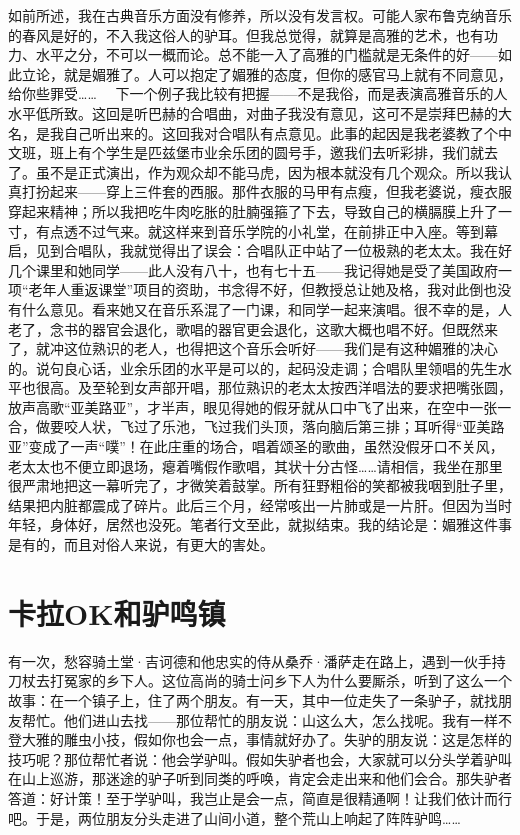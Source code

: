 如前所述，我在古典音乐方面没有修养，所以没有发言权。可能人家布鲁克纳音乐的春风是好的，不入我这俗人的驴耳。但我总觉得，就算是高雅的艺术，也有功力、水平之分，不可以一概而论。总不能一入了高雅的门槛就是无条件的好——如此立论，就是媚雅了。人可以抱定了媚雅的态度，但你的感官马上就有不同意见，给你些罪受……　 下一个例子我比较有把握——不是我俗，而是表演高雅音乐的人水平低所致。这回是听巴赫的合唱曲，对曲子我没有意见，这可不是崇拜巴赫的大名，是我自己听出来的。这回我对合唱队有点意见。此事的起因是我老婆教了个中文班，班上有个学生是匹兹堡市业余乐团的圆号手，邀我们去听彩排，我们就去了。虽不是正式演出，作为观众却不能马虎，因为根本就没有几个观众。所以我认真打扮起来——穿上三件套的西服。那件衣服的马甲有点瘦，但我老婆说，瘦衣服穿起来精神；所以我把吃牛肉吃胀的肚腩强箍了下去，导致自己的横膈膜上升了一寸，有点透不过气来。就这样来到音乐学院的小礼堂，在前排正中入座。等到幕启，见到合唱队，我就觉得出了误会：合唱队正中站了一位极熟的老太太。我在好几个课里和她同学——此人没有八十，也有七十五——我记得她是受了美国政府一项“老年人重返课堂”项目的资助，书念得不好，但教授总让她及格，我对此倒也没有什么意见。看来她又在音乐系混了一门课，和同学一起来演唱。很不幸的是，人老了，念书的器官会退化，歌唱的器官更会退化，这歌大概也唱不好。但既然来了，就冲这位熟识的老人，也得把这个音乐会听好——我们是有这种媚雅的决心的。说句良心话，业余乐团的水平是可以的，起码没走调；合唱队里领唱的先生水平也很高。及至轮到女声部开唱，那位熟识的老太太按西洋唱法的要求把嘴张圆，放声高歌“亚美路亚”，才半声，眼见得她的假牙就从口中飞了出来，在空中一张一合，做要咬人状，飞过了乐池，飞过我们头顶，落向脑后第三排；耳听得“亚美路亚”变成了一声“噗”！在此庄重的场合，唱着颂圣的歌曲，虽然没假牙口不关风，老太太也不便立即退场，瘪着嘴假作歌唱，其状十分古怪……请相信，我坐在那里很严肃地把这一幕听完了，才微笑着鼓掌。所有狂野粗俗的笑都被我咽到肚子里，结果把内脏都震成了碎片。此后三个月，经常咳出一片肺或是一片肝。但因为当时年轻，身体好，居然也没死。笔者行文至此，就拟结束。我的结论是：媚雅这件事是有的，而且对俗人来说，有更大的害处。

\chapter{卡拉OK和驴鸣镇}

有一次，愁容骑土堂·吉诃德和他忠实的侍从桑乔·潘萨走在路上，遇到一伙手持刀杖去打冤家的乡下人。这位高尚的骑士问乡下人为什么要厮杀，听到了这么一个故事：在一个镇子上，住了两个朋友。有一天，其中一位走失了一条驴子，就找朋友帮忙。他们进山去找——那位帮忙的朋友说：山这么大，怎么找呢。我有一样不登大雅的雕虫小技，假如你也会一点，事情就好办了。失驴的朋友说：这是怎样的技巧呢？那位帮忙者说：他会学驴叫。假如失驴者也会，大家就可以分头学着驴叫在山上巡游，那迷途的驴子听到同类的呼唤，肯定会走出来和他们会合。那失驴者答道：好计策！至于学驴叫，我岂止是会一点，简直是很精通啊！让我们依计而行吧。于是，两位朋友分头走进了山间小道，整个荒山上响起了阵阵驴鸣……　 

